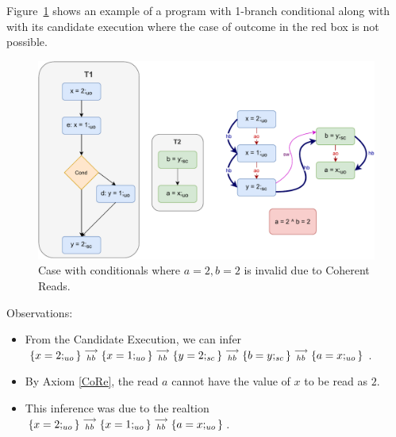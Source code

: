     Figure~\ref{reord:cond_counter_example2(a)} shows an example of a program with 1-branch conditional along with with its candidate execution where the case of outcome in the red box is not possible. 
    \begin{figure}[H]
        \centering 
        \includegraphics[scale=0.7]{5.InstructionReordering/5.ValidReorderingProgram/CounterExamples2a(Conditionals).pdf}
        \caption{Case with conditionals where $a = 2, b = 2$ is invalid due to Coherent Reads.}
        \label{reord:cond_counter_example2(a)}
    \end{figure}
    
    Observations:
    \begin{itemize}
        \item From the Candidate Execution, we can infer $\{x=2;_{uo}\}\stackrel{\longrightarrow}{_{hb}}\{x=1;_{uo}\}\stackrel{\longrightarrow}{_{hb}}\{y=2;_{sc}\}\stackrel{\longrightarrow}{_{hb}}\{b=y;_{sc}\}\stackrel{\longrightarrow}{_{hb}}\{a=x;_{uo}\}$.
        \item By Axiom \ref{CoRe}, the read $a$ cannot have the value of $x$ to be read as $2$.  
        \item This inference was due to the realtion $\{x=2;_{uo}\}\stackrel{\longrightarrow}{_{hb}}\{x=1;_{uo}\}\stackrel{\longrightarrow}{_{hb}}\{a=x;_{uo}\}$.
    \end{itemize}
    
